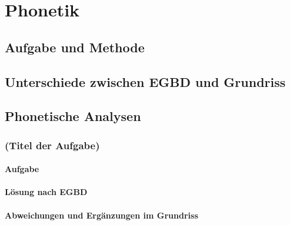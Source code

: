 \chapter{Phonetik}
\label{sec:phonetik}

\section{Aufgabe und Methode}
\label{sec:phonetik:aufgabeundmethoden}

\section{Unterschiede zwischen EGBD und Grundriss}
\label{sec:phonetik:unterschiedezwischenegbdundgrundriss}

\section{Phonetische Analysen}
\label{sec:phonetik:phonetischeanalysen}

\subsection{(Titel der Aufgabe)}

\subsubsection{Aufgabe}

\subsubsection{Lösung nach EGBD}

\subsubsection{Abweichungen und Ergänzungen im Grundriss}


